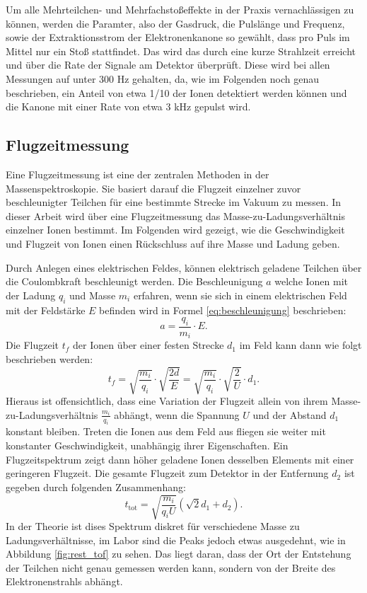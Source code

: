 Um alle Mehrteilchen- und Mehrfachstoßeffekte in der Praxis vernachlässigen zu können, werden die Paramter, also der Gasdruck, die Pulslänge und Frequenz, sowie der Extraktionsstrom der Elektronenkanone so gewählt, dass pro Puls im Mittel nur ein Stoß stattfindet. Das wird das durch eine kurze Strahlzeit erreicht und über die Rate der Signale am Detektor überprüft. Diese wird bei allen Messungen auf unter 300 Hz gehalten, da, wie im Folgenden noch genau beschrieben, ein Anteil von etwa 1/10 der Ionen detektiert werden können und die Kanone mit einer Rate von etwa 3 kHz gepulst wird.

\subsection{Flugzeitmessung}
Eine Flugzeitmessung ist eine der zentralen Methoden in der Massenspektroskopie. Sie basiert darauf die Flugzeit einzelner zuvor beschleunigter Teilchen für eine bestimmte Strecke im Vakuum zu messen. In dieser Arbeit wird über eine Flugzeitmessung das Masse-zu-Ladungsverhältnis einzelner Ionen bestimmt. Im Folgenden wird gezeigt, wie die Geschwindigkeit und Flugzeit von Ionen einen Rückschluss auf ihre Masse und Ladung geben.

Durch Anlegen eines elektrischen Feldes, können elektrisch geladene Teilchen über die Coulombkraft beschleunigt werden. Die Beschleunigung $a$ welche Ionen mit der Ladung $q_i$ und Masse $m_i$ erfahren, wenn sie sich in einem elektrischen Feld mit der Feldstärke $E$ befinden wird in Formel \ref{eq:beschleunigung} beschrieben: 
\begin{equation}
    \label{eq:beschleunigung}
    a = \frac{q_i}{m_i} \cdot E.
\end{equation}
Die Flugzeit $t_f$ der Ionen über einer festen Strecke $d_1$ im Feld kann dann wie folgt beschrieben werden:
\begin{equation}
    t_f = \sqrt{\frac{m_i}{q_i}} \cdot \sqrt{\frac{2d}{E}} = \sqrt{\frac{m_i}{q_i}} \cdot \sqrt{\frac{2}{U}} \cdot d_1.
\end{equation}
Hieraus ist offensichtlich, dass eine Variation der Flugzeit allein von ihrem Masse-zu-Ladungsverhältnis $\frac{m_i}{q_i}$ abhängt, wenn die Spannung $U$ und der Abstand $d_1$ konstant bleiben. Treten die Ionen aus dem Feld aus fliegen sie weiter mit konstanter Geschwindigkeit, unabhängig ihrer Eigenschaften. Ein Flugzeitspektrum zeigt dann höher geladene Ionen desselben Elements mit einer geringeren Flugzeit. Die gesamte Flugzeit zum Detektor in der Entfernung $d_2$ ist gegeben durch folgenden Zusammenhang:
\begin{equation}
    t_{\text{tot}} = \sqrt{\frac{m_i}{q_i U}} \left( \sqrt{2} d_1 + d_2 \right).
    \label{eq:time}
\end{equation}
In der Theorie ist dises Spektrum diskret für verschiedene Masse zu Ladungsverhältnisse, im Labor sind die Peaks jedoch etwas ausgedehnt, wie in Abbildung \ref{fig:rest_tof} zu sehen. Das liegt daran, dass der Ort der Entstehung der Teilchen nicht genau gemessen werden kann, sondern von der Breite des Elektronenstrahls abhängt.

